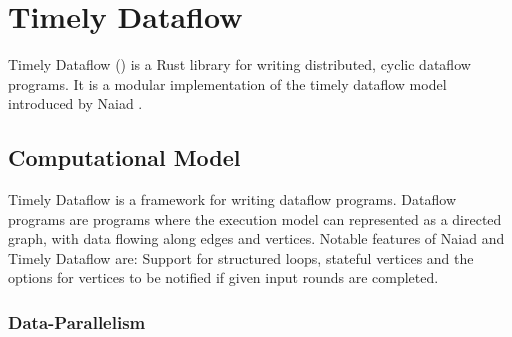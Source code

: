 \chapter{Timely Dataflow}\label{ch:background}

Timely Dataflow \cite{timely} () is a Rust library for writing distributed,
cyclic dataflow programs. It is a modular implementation of the timely dataflow
model introduced by Naiad \cite{naiad}. 

\section{Computational Model}

Timely Dataflow is a framework for writing dataflow programs. Dataflow programs
are programs where the execution model can represented as a directed graph, with data
flowing along edges and vertices. Notable features of Naiad and
Timely Dataflow are: Support for structured loops, stateful vertices and the
options for vertices to be notified if given input rounds are completed. \cite{naiad}

\subsection{Data-Parallelism}

